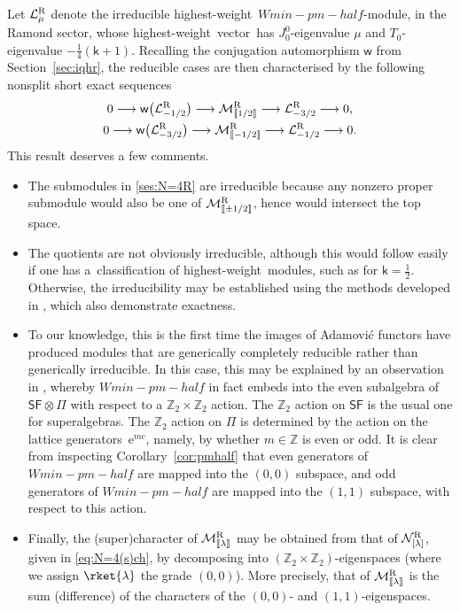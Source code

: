 \documentclass[10pt,a4paper]{amsart}
\numberwithin{equation}{section}
\newcommand{\ee}{\mathrm{e}} %
\newcommand{\kk}{\mathsf{k}} %
\newcommand{\R}{\textnormal{R}}
\DeclarePairedDelimiter{\brac}{\lparen}{\rparen} %
\DeclarePairedDelimiter{\dbrac}{\llbracket}{\rrbracket} %
\newcommand{\lra}{\longrightarrow}
\newcommand{\ses}[3]{0 \lra #1 \lra #2 \lra #3 \lra 0}
\newcommand{\fld}[1]{\mathbb{#1}} %
\newcommand{\VOA}[1]{\mathsf{#1}} %
\newcommand{\Mod}[1]{\mathcal{#1}} %
\newcommand{\ZZ}{\fld{Z}}
\newcommand{\sfsymb}{\VOA{SF}}
\newcommand{\lsymb}{\Pi}
\newcommand{\sfvoa}{\sfsymb} %
\newcommand{\lvoa}{\lsymb} %
\newcommand{\swalg}[2]{\VOA{W}_{#1}^{\mathrm{#2}}} %
\newcommand{\smin}[1][\kk]{\swalg{#1}{min}} %
\newcommand{\sminpmhalf}{\smin[\pm 1/2]}
\newcommand{\nconjsymb}{\mathsf{w}} %
\newcommand{\nconj}{\nconjsymb \brac}
\newcommand{\nrind}[1]{\Mod{N}^{\R}_{[#1]}}
\newcommand{\nrrel}[1]{\Mod{M}^{\R}_{\vphantom{[#1]}\smash{\dbrac{#1}}}}
\newcommand{\nrihw}[1]{\Mod{L}^{\R}_{#1}}
\newcommand{\hw}{highest-weight}
\newcommand{\hwv}{\hw\ vector}
\newcommand{\hwm}{\hw\ module}
\newcommand{\hwms}{\hwm s}
\def\smash#1{#1}
\def\sminpmhalf{Wmin-pm-half}
\begin{document}
Let \smash{$\nrihw{\mu}$} denote the irreducible \hw\ \smash{$\sminpmhalf$}-module, in the Ramond sector, whose \hwv\ has $J^0_0$-eigenvalue $\mu$ and $T_0$-eigenvalue $-\frac{1}{4}(\kk+1)$.
Recalling the conjugation automorphism $\nconjsymb$ from Section~\ref{sec:iqhr}, the reducible cases are then characterised by the following nonsplit short exact sequences
\begin{gather}
 \ses{\nconj[\big]{\nrihw{-1/2}}}{\nrrel{1/2}}{\nrihw{-3/2}}, \nonumber\\
 \ses{\nconj[\big]{\nrihw{-3/2}}}{\nrrel{-1/2}}{\nrihw{-1/2}}. \label{ses:N=4R}
\end{gather}
This result deserves a few comments.
\begin{itemize}\itemsep=0pt
	\item The submodules in \eqref{ses:N=4R} are irreducible because any nonzero proper submodule would also be one of \smash{$\nrrel{\pm1/2}$}, hence would intersect the top space.
	\item The quotients are not obviously irreducible, although this would follow easily if one has a~classification of \hwms, such as \cite[Proposition~6.2]{AdaRea14} for $\kk=\frac{1}{2}$.
	Otherwise, the irreducibility may be established using the methods developed in \cite[Proposition~4.13]{KawRel18}, which also demonstrate exactness.
 \item To our knowledge, this is the first time the images of Adamovi{\'c} functors have produced modules that are generically completely reducible rather than generically irreducible. In this case, this may be explained by an observation in \cite{AdaVer20}, whereby \smash{$\sminpmhalf$} in fact embeds into the even subalgebra of $\sfvoa \otimes \lvoa$ with respect to a $\ZZ_2 \times \ZZ_2$ action. The $\ZZ_2$ action on $\sfvoa$ is the usual one for superalgebras. The $\ZZ_2$ action on $\lvoa$ is determined by the action on the lattice generators~$\ee^{mc}$, namely, by whether $m \in \ZZ$ is even or odd. It is clear from inspecting Corollary~\ref{cor:pmhalf} that even generators of \smash{$\sminpmhalf$} are mapped into the $(0,0)$ subspace, and odd generators of \smash{$\sminpmhalf$} are mapped into the $(1,1)$ subspace, with respect to this action.
 \item Finally, the (super)character of \smash{$\nrrel{\lambda}$} may be obtained from that of \smash{$\nrind{\lambda}$}, given in \eqref{eq:N=4(s)ch}, by decomposing into $(\ZZ_2 \times \ZZ_2)$-eigenspaces (where we assign $\rket{\lambda}$ the grade $(0,0)$).
 More precisely, that of \smash{$\nrrel{\lambda}$} is the sum (difference) of the characters of the $(0,0)$- and $(1,1)$-eigenspaces.
\end{itemize}
\end{document}
